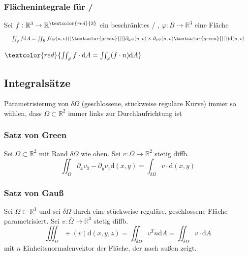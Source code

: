 \begin{sectionbox}
    \subsubsection{Flächenintegrale für \textcolor{green}{}/\textcolor{red}{}}
    Sei $f : \mathbb R^3 \rightarrow \mathbb R^{\textcolor{red}{3}}$ ein beschränktes \textcolor{green}{} / \textcolor{red}{}, $\varphi : B \rightarrow \mathbb R^3$ eine Fläche
    \begin{equation*}
        \resizebox{\hsize}{!}
        {
            $\iint_\varphi f \mathrm dA=\iint_B f(\varphi(u,v)) (\textcolor{green}{||} \partial_u \varphi(u,v) \times \partial_v \varphi(u,v) \textcolor{green}{||})\mathrm d(u,v)$
        }
    \end{equation*}

    $\textcolor{red}{\iint_\varphi f \cdot \mathrm dA = \iint_\varphi (f \cdot n)\mathrm dA}$
\end{sectionbox}

\subsection{Integralsätze}
Parametrisierung von $\delta \Omega$ (geschlossene, stückweise reguläre Kurve) immer so wählen, dass $\Omega \subset \mathbb R^2$ immer links zur Durchlaufrichtung ist
\begin{emphbox}
    \subsubsection{Satz von Green}
    Sei $\Omega \subset \mathbb R^2$ mit Rand $\delta \Omega$ wie oben. Sei $v: \overline{\Omega} \rightarrow \mathbb R^2$ stetig diffb.
    \begin{equation*}
        \iint_{\Omega}\partial_xv_2-\partial_yv_1 \mathrm d(x,y)=\int_{\delta\Omega}v \cdot \mathrm d(x,y)
    \end{equation*}
\end{emphbox}

\begin{emphbox}
    \subsubsection{Satz von Gauß}
    Sei $\Omega \subset \mathbb R^3$ und sei $\delta \Omega$ durch eine stückweise reguläre, geschlossene Fläche parametrisiert. 
    Sei $v : \overline{\Omega} \rightarrow \mathbb R^3$ stetig diffb.
    \begin{equation*}
        \iiint_\Omega \div (v) \mathrm d(x,y,z) = \iint_{\delta \Omega}v^Tn\mathrm dA=\iint_{\delta \Omega}v \cdot \mathrm dA
    \end{equation*}
    mit $n$ Einheitsnormalenvektor der Fläche, der nach außen zeigt.
\end{emphbox}

